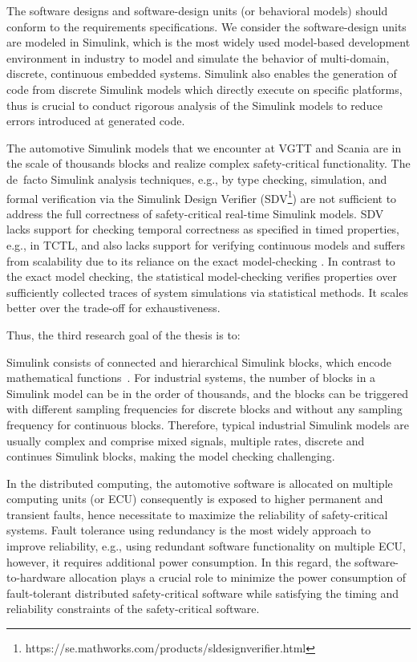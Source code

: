 The software designs and software-design units (or behavioral models) should conform to the requirements specifications. We consider the software-design units are modeled in Simulink, which is the most widely used model-based development environment in industry to model and simulate the behavior of multi-domain, discrete, continuous embedded systems. Simulink also enables the generation of code from discrete Simulink models which directly execute on specific platforms, thus is crucial to conduct rigorous analysis of the Simulink models to reduce errors introduced at generated code.

The automotive Simulink models that we encounter at VGTT and Scania are in the scale of thousands blocks and realize complex safety-critical functionality. 
The de~facto Simulink analysis techniques, e.g., by type checking, simulation, and formal verification via the Simulink Design Verifier (SDV\footnote{https://se.mathworks.com/products/sldesignverifier.html}) are not sufficient to address the full correctness of safety-critical real-time Simulink models. SDV lacks support for checking temporal correctness as specified in timed properties, e.g., in TCTL, and also lacks support for verifying continuous models and suffers from scalability due to its reliance on the exact model-checking \cite{Leitner2008SimulinkStudy}. In contrast to the exact model checking, the statistical model-checking verifies properties over sufficiently collected traces of system simulations via statistical methods. It scales better over the trade-off for exhaustiveness. 

Thus, the third research goal of the thesis is to:
\begin{researchgoal}
\end{researchgoal}

Simulink consists of connected and hierarchical Simulink blocks, which encode mathematical functions~\cite{JamesB.Dabney2003MasteringSimulink}. For industrial systems, the number of blocks in a Simulink model can be in the order of thousands, and the blocks can be triggered with different sampling frequencies for discrete blocks and without any sampling frequency 
for continuous blocks. Therefore, typical industrial Simulink models are usually complex and comprise mixed signals, multiple rates, discrete and continues Simulink blocks, making the model checking challenging.

In the distributed computing, the automotive software is allocated on multiple computing units (or ECU) consequently is exposed to higher permanent and transient faults, hence necessitate to maximize the reliability of safety-critical systems. Fault tolerance using redundancy is the most widely approach to improve reliability, e.g., using redundant software functionality on multiple ECU, however, it requires additional power consumption. In this regard, the software-to-hardware allocation plays a crucial role to minimize the power consumption of fault-tolerant distributed safety-critical software while satisfying the timing and reliability constraints of the safety-critical software.

